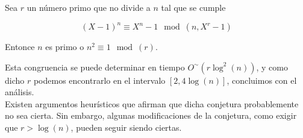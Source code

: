 \begin{conjetura}
	Sea $r$ un número primo que no divide a $n$ tal que se cumple
	
	\begin{equation}
	(X - 1)^n \equiv X^n - 1 \mod(n, X^r - 1)
	\end{equation}
	
	Entonce $n$ es primo o $n^2 \equiv 1 \mod(r)$.
\end{conjetura}

Esta congruencia se puede determinar en tiempo $O^\sim(r\log^2(n))$, y como dicho $r$ podemos encontrarlo en el intervalo $[2, 4\log(n)]$, concluimos con el análisis.\\

Existen argumentos heurísticos que afirman que dicha conjetura probablemente no sea cierta. Sin embargo, algunas modificaciones de la conjetura, como exigir que $r > \log(n)$, pueden seguir siendo ciertas.

\endinput
